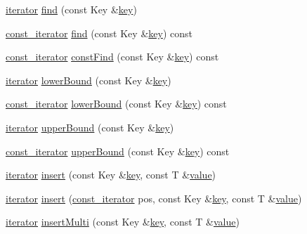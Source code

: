\begin{DoxyCompactItemize}
\hyperlink{class_q_map_1_1iterator}{iterator} \hyperlink{class_q_map_a8cf44b635018eb178cc724ed20379d85}{find} (const Key \&\hyperlink{class_q_map_a7ad0c404885c5287fe593849e4bc80d6}{key})
\item 
\hyperlink{class_q_map_1_1const__iterator}{const\+\_\+iterator} \hyperlink{class_q_map_a0039730f5b5bb80ef4937d5a798f96c0}{find} (const Key \&\hyperlink{class_q_map_a7ad0c404885c5287fe593849e4bc80d6}{key}) const 
\item 
\hyperlink{class_q_map_1_1const__iterator}{const\+\_\+iterator} \hyperlink{class_q_map_a4777a4aa1616ea8443c8b66bce74602f}{const\+Find} (const Key \&\hyperlink{class_q_map_a7ad0c404885c5287fe593849e4bc80d6}{key}) const 
\item 
\hyperlink{class_q_map_1_1iterator}{iterator} \hyperlink{class_q_map_a7c26eec01e2b6053993018f710ff794c}{lower\+Bound} (const Key \&\hyperlink{class_q_map_a7ad0c404885c5287fe593849e4bc80d6}{key})
\item 
\hyperlink{class_q_map_1_1const__iterator}{const\+\_\+iterator} \hyperlink{class_q_map_a39bab49063dee3a17e004666e72b4993}{lower\+Bound} (const Key \&\hyperlink{class_q_map_a7ad0c404885c5287fe593849e4bc80d6}{key}) const 
\item 
\hyperlink{class_q_map_1_1iterator}{iterator} \hyperlink{class_q_map_abb757580db388ce382c6b50670f819b4}{upper\+Bound} (const Key \&\hyperlink{class_q_map_a7ad0c404885c5287fe593849e4bc80d6}{key})
\item 
\hyperlink{class_q_map_1_1const__iterator}{const\+\_\+iterator} \hyperlink{class_q_map_a6efc980cc3b0a1dd688aafa7ab08a39d}{upper\+Bound} (const Key \&\hyperlink{class_q_map_a7ad0c404885c5287fe593849e4bc80d6}{key}) const 
\item 
\hyperlink{class_q_map_1_1iterator}{iterator} \hyperlink{class_q_map_a0cc56ab47ea14af1127ac7399814d289}{insert} (const Key \&\hyperlink{class_q_map_a7ad0c404885c5287fe593849e4bc80d6}{key}, const T \&\hyperlink{class_q_map_ab9c04f61f4abd94439d4431118a238e5}{value})
\item 
\hyperlink{class_q_map_1_1iterator}{iterator} \hyperlink{class_q_map_a60a6aec6ecf27fc24390af0f4fe59ba4}{insert} (\hyperlink{class_q_map_1_1const__iterator}{const\+\_\+iterator} pos, const Key \&\hyperlink{class_q_map_a7ad0c404885c5287fe593849e4bc80d6}{key}, const T \&\hyperlink{class_q_map_ab9c04f61f4abd94439d4431118a238e5}{value})
\item 
\hyperlink{class_q_map_1_1iterator}{iterator} \hyperlink{class_q_map_a075634da2cf912a20dd1c4a5835acfa3}{insert\+Multi} (const Key \&\hyperlink{class_q_map_a7ad0c404885c5287fe593849e4bc80d6}{key}, const T \&\hyperlink{class_q_map_ab9c04f61f4abd94439d4431118a238e5}{value})

\end{DoxyCompactItemize}
